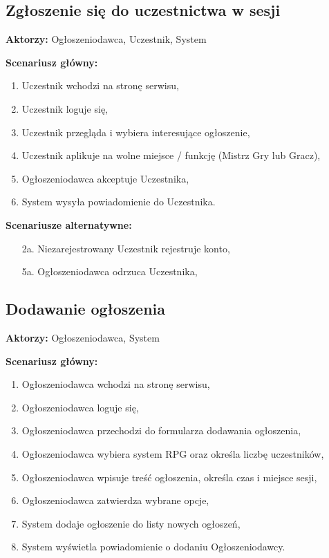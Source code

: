 
\subsection*{Zgłoszenie się do uczestnictwa w sesji}

\textbf{Aktorzy:} Ogłoszeniodawca, Uczestnik, System

\textbf{Scenariusz główny:}
	\begin{enumerate}
	\item Uczestnik wchodzi na stronę serwisu,
	\item Uczestnik loguje się,
	\item Uczestnik przegląda i wybiera interesujące ogłoszenie,
	\item Uczestnik aplikuje na wolne miejsce / funkcję (Mistrz Gry lub Gracz),
	\item Ogłoszeniodawca akceptuje Uczestnika,
	\item System wysyła powiadomienie do Uczestnika.
	\end{enumerate}

\textbf{Scenariusze alternatywne:}
	\begin{enumerate}
	\item[2a.] Niezarejestrowany Uczestnik rejestruje konto,
	\item[5a.] Ogłoszeniodawca odrzuca Uczestnika,
	\end{enumerate}

\subsection*{Dodawanie ogłoszenia}

\textbf{Aktorzy:} Ogłoszeniodawca, System

\textbf{Scenariusz główny:}
	\begin{enumerate}
	\item Ogłoszeniodawca wchodzi na stronę serwisu,
	\item Ogłoszeniodawca loguje się,
	\item Ogłoszeniodawca przechodzi do formularza dodawania ogłoszenia,
	\item Ogłoszeniodawca wybiera system RPG oraz określa liczbę uczestników,
	\item Ogłoszeniodawca wpisuje treść ogłoszenia, określa czas i miejsce sesji,
	\item Ogłoszeniodawca zatwierdza wybrane opcje,
	\item System dodaje ogłoszenie do listy nowych ogłoszeń,
	\item System wyświetla powiadomienie o dodaniu Ogłoszeniodawcy.
	\end{enumerate}

